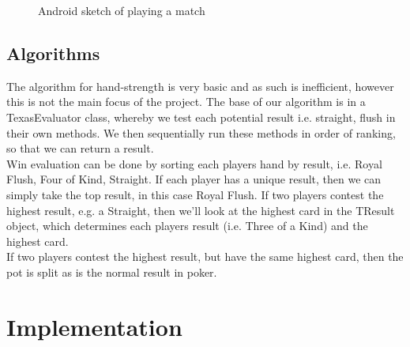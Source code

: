 \documentclass[11pt]{article}
\begin{document}
\begin{figure}[h]
	\caption{Android sketch of playing a match}
	
\end{figure} 

\newpage


\subsection{Algorithms}

The algorithm for hand-strength is very basic and as such is inefficient, however this is not the main focus of the project. The base of our algorithm is in a TexasEvaluator class, whereby we test each potential result i.e. straight, flush in their own methods. We then sequentially run these methods in order of ranking, so that we can return a result. \\


Win evaluation can be done by sorting each players hand by result, i.e. Royal Flush, Four of Kind, Straight. If each player has a unique result, then we can simply take the top result, in this case Royal Flush. If two players contest the highest result, e.g. a Straight, then we'll look at the highest card in the TResult object, which determines each players result (i.e. Three of a Kind) and the highest card. \\

If two players contest the highest result, but have the same highest card, then the pot is split as is the normal result in poker. 

\newpage
\section{Implementation}
\end{document}
